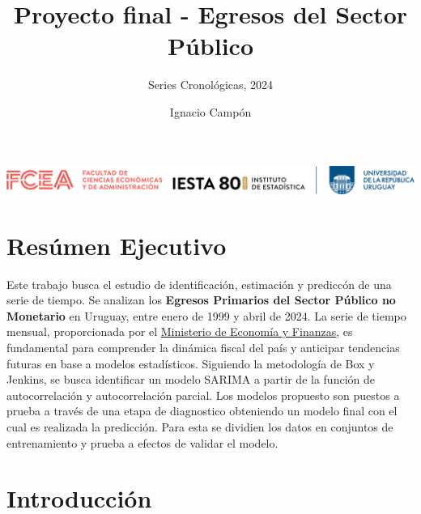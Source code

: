 \documentclass[
  12pt,
]{article}
\title{Proyecto final - Egresos del Sector Público}
\subtitle{Series Cronológicas, 2024}
\author{Ignacio Campón}
\date{}
\begin{document}
\maketitle

\maketitle

\thispagestyle{empty} %
\vspace*{\fill} %
\begin{center}
\includegraphics[width=16cm]{imagenes/logo_inst_80.png}\\[1cm] %
\end{center}

\newpage

\hypertarget{resuxfamen-ejecutivo}{%
\section*{Resúmen Ejecutivo}\label{resuxfamen-ejecutivo}}

Este trabajo busca el estudio de identificación, estimación y prediccón
de una serie de tiempo. Se analizan los \textbf{Egresos Primarios del
Sector Público no Monetario} en Uruguay, entre enero de 1999 y abril de
2024. La serie de tiempo mensual, proporcionada por el
\href{https://www.gub.uy/ministerio-economia-finanzas/datos-y-estadisticas/estadisticas/informacion-resultados-del-sector-publico}{Ministerio
de Economía y Finanzas}, es fundamental para comprender la dinámica
fiscal del país y anticipar tendencias futuras en base a modelos
estadísticos. Siguiendo la metodología de Box y Jenkins, se busca
identificar un modelo SARIMA a partir de la función de autocorrelación y
autocorrelación parcial. Los modelos propuesto son puestos a prueba a
través de una etapa de diagnostico obteniendo un modelo final con el
cual es realizada la predicción. Para esta se dividien los datos en
conjuntos de entrenamiento y prueba a efectos de validar el modelo.

\newpage

\tableofcontents

\newpage

\hypertarget{introducciuxf3n}{%
\section{Introducción}\label{introducciuxf3n}}
\end{document}
